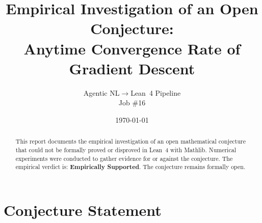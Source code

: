 \documentclass[11pt]{article}
\title{Empirical Investigation of an Open Conjecture:\\
Anytime Convergence Rate of Gradient Descent}
\author{Agentic NL$\to$Lean~4 Pipeline \\ \small Job \#16}
\date{\today}
\begin{document}
\maketitle

\begin{abstract}
This report documents the empirical investigation of an open mathematical conjecture
that could not be formally proved or disproved in Lean~4 with Mathlib.
Numerical experiments were conducted to gather evidence for or against the conjecture.
The empirical verdict is: \textbf{\textcolor{green!70!black}{Empirically Supported}}.
The conjecture remains formally open.
\end{abstract}

\section{Conjecture Statement}
\end{document}
